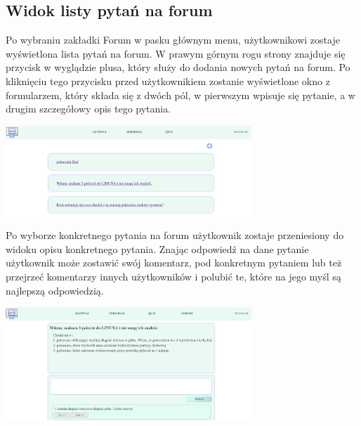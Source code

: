 \documentclass[10pt,a4paper]{report}
\begin{document}
\begin{adjustwidth}{2cm}{2cm}
\subsection{Widok listy pytań na forum}
\begin{minipage}{1\linewidth}
Po wybraniu zakładki Forum w pasku głównym menu, użytkownikowi zostaje wyświetlona lista pytań na forum. W prawym górnym rogu strony znajduje się przycisk w wyglądzie plusa, który służy do dodania nowych pytań na forum. Po kliknięciu tego przycisku przed użytkownikiem zostanie wyświetlone okno z formularzem, który składa się z dwóch pól, w pierwszym wpisuje się pytanie, a w drugim szczegółowy opis tego pytania. \\ 
\end{minipage}
\begin{minipage}{\linewidth}
\begin{center}
  \includegraphics[width=350px]{project/forum.png}
\end{center}
\end{minipage}
\begin{minipage}{1\linewidth}
\vspace{0.3cm}
Po wyborze konkretnego pytania na forum użytkownik zostaje przeniesiony do widoku opisu konkretnego pytania. Znając odpowiedź na dane pytanie użytkownik może zostawić swój komentarz, pod konkretnym pytaniem lub też przejrzeć komentarzy innych użytkowników i polubić te, które na jego myśl są najlepszą odpowiedzią.\\
\end{minipage}
\begin{minipage}{\linewidth}
\begin{center}
  \includegraphics[width=350px]{project/quest_comment.png}
\end{center}
\end{minipage}

\end{adjustwidth}
\end{document}
